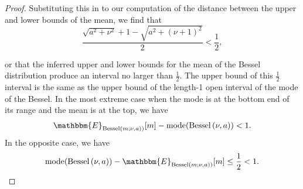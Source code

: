 \documentclass[letterpaper]{article}
\newcommand{\Bess}[1]{\textup{Bessel}\left( #1 \right)}
\begin{document}
\begin{proof}
  Substituting this in to our computation of the distance between the upper and
  lower bounds of the mean, we find that
  \begin{equation}
  \frac{\sqrt{a^2 + \nu^2} + 1 - \sqrt{a^2 + (\nu + 1)^2}}{2} < \frac{1}{2},
  \end{equation}
  
  or that the inferred upper and lower bounds for the mean of the Bessel
  distribution produce an interval no larger than $\frac{1}{2}$. The upper bound
  of this $\frac{1}{2}$ interval is the same as the upper bound of the length-1
  open interval of the mode of the Bessel. In the most extreme case when the
  mode is at the bottom end of its range and the mean is at the top, we have
  \[
      \mathbbm{E}_{\Bess{m; \nu, a})}[m] - \textup{mode}(\Bess{\nu, a}) < 1.
  \]
  In the opposite case, we have 
  \[
      \textup{mode}(\Bess{\nu, a}) - \mathbbm{E}_{\Bess{m; \nu, a})}[m] \leq \frac{1}{2} < 1.
  \]
  \end{proof}
  
\end{document}
